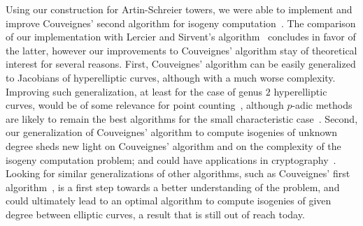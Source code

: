 Using our construction for Artin-Schreier towers, we were able to
implement and improve Couveignes' second algorithm for isogeny
computation~\cite{couveignes96}. The comparison of our implementation
with Lercier and Sirvent's algorithm~\cite{lercier+sirvent08}
concludes in favor of the latter, however our improvements to
Couveignes' algorithm stay of theoretical interest for several
reasons. First, Couveignes' algorithm can be easily generalized to
Jacobians of hyperelliptic curves, although with a much worse
complexity. Improving such generalization, at least for the case of
genus $2$ hyperelliptic curves, would be of some relevance for point
counting~\cite{schoof95,pila90,gaudry+schost04}, although $p$-adic
methods are likely to remain the best algorithms for the small
characteristic case~\cite{kedlaya01,denef+vercauteren06}. Second, our
generalization of Couveignes' algorithm to compute isogenies of
unknown degree sheds new light on Couveignes' algorithm and on the
complexity of the isogeny computation problem; and could have
applications in cryptography~\cite{teske06,rostovtsev+stolbunov06}.
Looking for similar generalizations of other algorithms, such as
Couveignes' first algorithm~\cite{couveignes94}, is a first step
towards a better understanding of the problem, and could ultimately
lead to an optimal algorithm to compute isogenies of given degree
between elliptic curves, a result that is still out of reach today.


